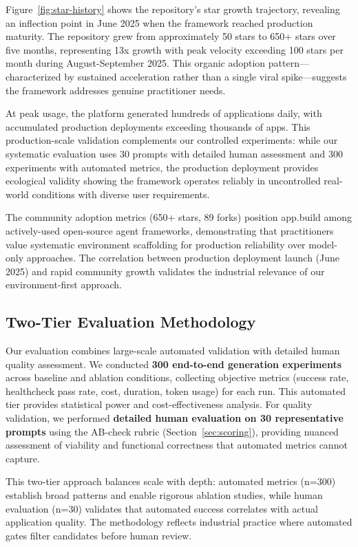 \documentclass[conference]{IEEEtran}
\begin{document}
Figure~\ref{fig:star-history} shows the repository's star growth trajectory, revealing an inflection point in June 2025 when the framework reached production maturity. The repository grew from approximately 50 stars to 650+ stars over five months, representing 13x growth with peak velocity exceeding 100 stars per month during August-September 2025. This organic adoption pattern—characterized by sustained acceleration rather than a single viral spike—suggests the framework addresses genuine practitioner needs.

At peak usage, the platform generated hundreds of applications daily, with accumulated production deployments exceeding thousands of apps. This production-scale validation complements our controlled experiments: while our systematic evaluation uses 30 prompts with detailed human assessment and 300 experiments with automated metrics, the production deployment provides ecological validity showing the framework operates reliably in uncontrolled real-world conditions with diverse user requirements.

The community adoption metrics (650+ stars, 89 forks) position app.build among actively-used open-source agent frameworks, demonstrating that practitioners value systematic environment scaffolding for production reliability over model-only approaches. The correlation between production deployment launch (June 2025) and rapid community growth validates the industrial relevance of our environment-first approach.

\subsection{Two-Tier Evaluation Methodology}

Our evaluation combines large-scale automated validation with detailed human quality assessment. We conducted \textbf{300 end-to-end generation experiments} across baseline and ablation conditions, collecting objective metrics (success rate, healthcheck pass rate, cost, duration, token usage) for each run. This automated tier provides statistical power and cost-effectiveness analysis. For quality validation, we performed \textbf{detailed human evaluation on 30 representative prompts} using the AB-check rubric (Section~\ref{sec:scoring}), providing nuanced assessment of viability and functional correctness that automated metrics cannot capture.

This two-tier approach balances scale with depth: automated metrics (n=300) establish broad patterns and enable rigorous ablation studies, while human evaluation (n=30) validates that automated success correlates with actual application quality. The methodology reflects industrial practice where automated gates filter candidates before human review.
\end{document}
